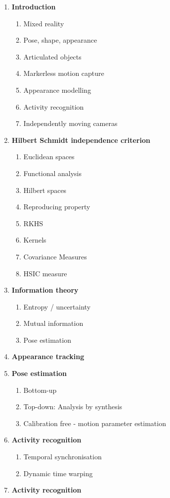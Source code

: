 \begin{enumerate}
\item{\textbf{Introduction}}
  \begin{enumerate}
    \item{Mixed reality}
        \item{Pose, shape, appearance}
        \item{Articulated objects}
        \item{Markerless motion capture}
        \item{Appearance modelling}
        \item{Activity recognition}
        \item{Independently moving cameras}
          \end{enumerate}
\item{\textbf{Hilbert Schmidt independence criterion}}
  \begin{enumerate}
    \item{Euclidean spaces}
        \item{Functional analysis}
        \item{Hilbert spaces}
        \item{Reproducing property}
        \item{RKHS}
        \item{Kernels}
          \item{Covariance Measures}
        \item{HSIC measure}
          \end{enumerate}
\item{\textbf{Information theory}}
  \begin{enumerate}
    \item{Entropy / uncertainty}
        \item{Mutual information}
        \item{Pose estimation}
          \end{enumerate}
\item{\textbf{Appearance tracking}}
\item{\textbf{Pose estimation}}
  \begin{enumerate}
    \item{Bottom-up}
        \item{Top-down: Analysis by synthesis}
        \item{Calibration free - motion parameter estimation}
          \end{enumerate}
\item{\textbf{Activity recognition}}
  \begin{enumerate}
    \item{Temporal synchronisation}
      \item{Dynamic time warping}
        \end{enumerate}
\item{\textbf{Activity recognition}}
\end{enumerate}


